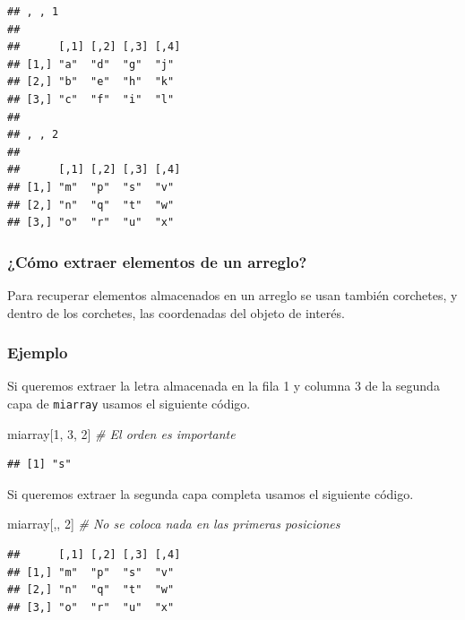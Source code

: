 \documentclass[10pt,]{krantz}
\makeatletter
\newenvironment{Shaded}{\begin{snugshade}}{\end{snugshade}}
\newcommand{\DecValTok}[1]{\textcolor[rgb]{0.00,0.00,0.81}{#1}}
\newcommand{\CommentTok}[1]{\textcolor[rgb]{0.56,0.35,0.01}{\textit{#1}}}
\newcommand{\NormalTok}[1]{#1}
\newenvironment{kframe}{%
\medskip{}
\setlength{\fboxsep}{.8em}
 \def\at@end@of@kframe{}%
 \ifinner\ifhmode%
  \def\at@end@of@kframe{\end{minipage}}%
  \begin{minipage}{\columnwidth}%
 \fi\fi%
 \def\FrameCommand##1{\hskip\@totalleftmargin \hskip-\fboxsep
 \colorbox{shadecolor}{##1}\hskip-\fboxsep
     \hskip-\linewidth \hskip-\@totalleftmargin \hskip\columnwidth}%
 \MakeFramed {\advance\hsize-\width
   \@totalleftmargin\z@ \linewidth\hsize
   \@setminipage}}%
 {\par\unskip\endMakeFramed%
 \at@end@of@kframe}
\renewenvironment{Shaded}{\begin{kframe}}{\end{kframe}}
\makeatother
\begin{document}
\begin{verbatim}
## , , 1
## 
##      [,1] [,2] [,3] [,4]
## [1,] "a"  "d"  "g"  "j" 
## [2,] "b"  "e"  "h"  "k" 
## [3,] "c"  "f"  "i"  "l" 
## 
## , , 2
## 
##      [,1] [,2] [,3] [,4]
## [1,] "m"  "p"  "s"  "v" 
## [2,] "n"  "q"  "t"  "w" 
## [3,] "o"  "r"  "u"  "x"
\end{verbatim}

\subsubsection{¿Cómo extraer elementos de un
arreglo?}\label{como-extraer-elementos-de-un-arreglo}

Para recuperar elementos almacenados en un arreglo se usan también
corchetes, y dentro de los corchetes, las coordenadas del objeto de
interés.

\subsubsection*{Ejemplo}\label{ejemplo-2}

Si queremos extraer la letra almacenada en la fila 1 y columna 3 de la
segunda capa de \texttt{miarray} usamos el siguiente código.

\begin{Shaded}
\begin{Highlighting}[]
\NormalTok{miarray[}\DecValTok{1}\NormalTok{, }\DecValTok{3}\NormalTok{, }\DecValTok{2}\NormalTok{]  }\CommentTok{# El orden es importante}
\end{Highlighting}
\end{Shaded}

\begin{verbatim}
## [1] "s"
\end{verbatim}

Si queremos extraer la segunda capa completa usamos el siguiente código.

\begin{Shaded}
\begin{Highlighting}[]
\NormalTok{miarray[,, }\DecValTok{2}\NormalTok{]  }\CommentTok{# No se coloca nada en las primeras posiciones}
\end{Highlighting}
\end{Shaded}

\begin{verbatim}
##      [,1] [,2] [,3] [,4]
## [1,] "m"  "p"  "s"  "v" 
## [2,] "n"  "q"  "t"  "w" 
## [3,] "o"  "r"  "u"  "x"
\end{verbatim}
\end{document}
